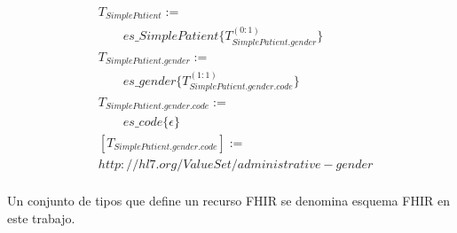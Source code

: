 \begin{align*}
&T_{SimplePatient}:= \\
&\qquad es\_SimplePatient\{T_{SimplePatient.gender}^{(0:1)}\} \\
&T_{SimplePatient.gender}:= \\
&\qquad es\_gender\{T_{SimplePatient.gender.code}^{(1:1)}\} \\
&T_{SimplePatient.gender.code}:= \\
&\qquad es\_code\{\epsilon\} \\
&[T_{SimplePatient.gender.code}] := \\
& http://hl7.org/ValueSet/administrative-gender \\
\end{align*}

Un conjunto de tipos que define un recurso FHIR se denomina esquema FHIR en este trabajo.
